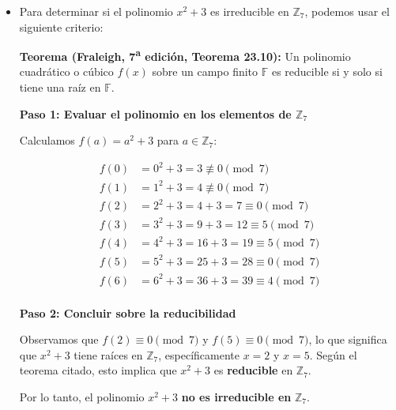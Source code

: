 \begin{itemize}
    \item Para determinar si el polinomio $ x^2 + 3 $ es irreducible en $ \mathbb{Z}_7 $, podemos usar el siguiente criterio:
    
    \textbf{Teorema (Fraleigh, 7\textsuperscript{a} edición, Teorema 23.10):}  
    Un polinomio cuadrático o cúbico $ f(x) $ sobre un campo finito $ \mathbb{F} $ es reducible si y solo si tiene una raíz en $ \mathbb{F} $.

    \textbf{Paso 1: Evaluar el polinomio en los elementos de $ \mathbb{Z}_7 $}

    Calculamos $ f(a) = a^2 + 3 $ para $ a \in \mathbb{Z}_7 $:

    \[
    \begin{aligned}
    f(0) &= 0^2 + 3 = 3 \not\equiv 0 \pmod{7} \\
    f(1) &= 1^2 + 3 = 4 \not\equiv 0 \pmod{7} \\
    f(2) &= 2^2 + 3 = 4 + 3 = 7 \equiv 0 \pmod{7} \\
    f(3) &= 3^2 + 3 = 9 + 3 = 12 \equiv 5 \pmod{7} \\
    f(4) &= 4^2 + 3 = 16 + 3 = 19 \equiv 5 \pmod{7} \\
    f(5) &= 5^2 + 3 = 25 + 3 = 28 \equiv 0 \pmod{7} \\
    f(6) &= 6^2 + 3 = 36 + 3 = 39 \equiv 4 \pmod{7} \\
    \end{aligned}
    \]

    \textbf{Paso 2: Concluir sobre la reducibilidad}

    Observamos que $ f(2) \equiv 0 \pmod{7} $ y $ f(5) \equiv 0 \pmod{7} $, lo que significa que $ x^2 + 3 $ tiene raíces en $ \mathbb{Z}_7 $, específicamente $ x = 2 $ y $ x = 5 $. Según el teorema citado, esto implica que $ x^2 + 3 $ es \textbf{reducible} en $ \mathbb{Z}_7 $.

    Por lo tanto, el polinomio $ x^2 + 3 $ \textbf{no es irreducible en} $ \mathbb{Z}_7 $.
\end{itemize}